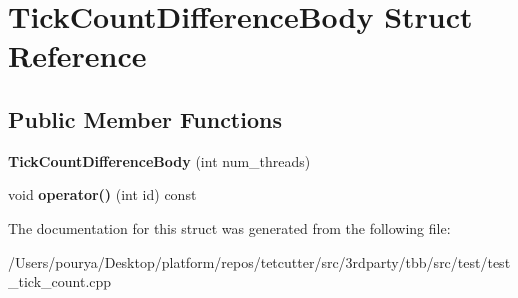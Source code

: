 \hypertarget{structTickCountDifferenceBody}{}\section{Tick\+Count\+Difference\+Body Struct Reference}
\label{structTickCountDifferenceBody}
\subsection*{Public Member Functions}
\begin{DoxyCompactItemize}
\item 
\hypertarget{structTickCountDifferenceBody_a874b585c3f3b308c7b9ae797ab1e03b5}{}{\bfseries Tick\+Count\+Difference\+Body} (int num\+\_\+threads)\label{structTickCountDifferenceBody_a874b585c3f3b308c7b9ae797ab1e03b5}

\item 
\hypertarget{structTickCountDifferenceBody_a6c699b5c570d8753378e0f99a9d2ff40}{}void {\bfseries operator()} (int id) const \label{structTickCountDifferenceBody_a6c699b5c570d8753378e0f99a9d2ff40}

\end{DoxyCompactItemize}


The documentation for this struct was generated from the following file\+:\begin{DoxyCompactItemize}
\item 
/\+Users/pourya/\+Desktop/platform/repos/tetcutter/src/3rdparty/tbb/src/test/test\+\_\+tick\+\_\+count.\+cpp\end{DoxyCompactItemize}
